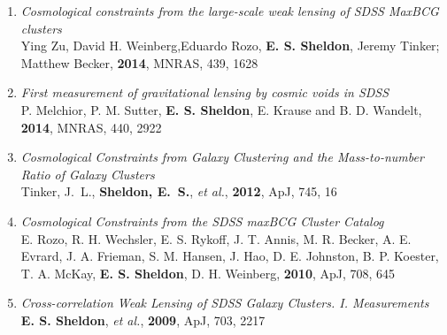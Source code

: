 \documentclass[10pt]{article}
\begin{document}
\begin{enumerate}

    \item \textit{Cosmological constraints from the large-scale weak lensing of SDSS MaxBCG clusters}\\
        Ying Zu, David H. Weinberg,Eduardo Rozo, {\bf E. S. Sheldon}, Jeremy Tinker; Matthew Becker,
        {\bf 2014}, MNRAS, 439, 1628

    \item \textit{First measurement of gravitational lensing by cosmic voids in SDSS}\\
        P. Melchior, P. M. Sutter, {\bf E. S. Sheldon}, E. Krause and B. D. Wandelt,
        {\bf 2014}, MNRAS, 440, 2922

    \item \textit{Cosmological Constraints from Galaxy Clustering and the Mass-to-number Ratio of Galaxy Clusters}\\
        Tinker, J.~L., {\bf Sheldon, E.~S.}, {\em et al.}, {\bf 2012}, ApJ, 745, 16

    \item \textit{Cosmological Constraints from the SDSS maxBCG Cluster Catalog}\\
        E. Rozo, R. H. Wechsler, E. S. Rykoff, J. T. Annis, 
        M. R. Becker, A. E. Evrard, J. A. Frieman, S. M. Hansen, 
        J. Hao, D. E. Johnston, B. P. Koester, T. A. McKay, 
        {\bf E. S. Sheldon}, D. H. Weinberg, {\bf 2010}, ApJ, 708, 645


    \item \textit{Cross-correlation Weak Lensing of SDSS Galaxy Clusters. I. Measurements}\\
        {\bf E. S. Sheldon}, {\em et al.}, {\bf 2009}, ApJ, 703, 2217


\end{enumerate}

\end{document}
